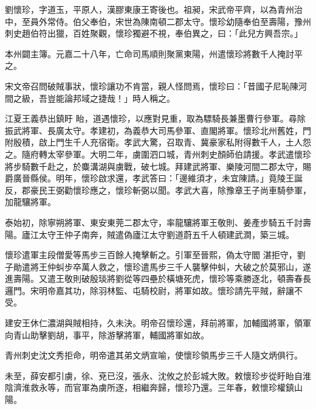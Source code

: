 
\begin{pinyinscope}

 劉懷珍，字道玉，平原人，漢膠東康王寄後也。祖昶，宋武帝平齊，以為青州治中，至員外常侍。伯父奉伯，宋世為陳南頓二郡太守。懷珍幼隨奉伯至壽陽，豫州刺史趙伯符出獵，百姓聚觀，懷珍獨避不視，奉伯異之，曰：「此兒方興吾宗。」



 本州闢主簿。元嘉二十八年，亡命司馬順則聚黨東陽，州遣懷珍將數千人掩討平之。



 宋文帝召問破賊事狀，懷珍讓功不肯當，親人怪問焉，懷珍曰：「昔國子尼恥陳河間之級，吾豈能論邦域之捷哉！」時人稱之。



 江夏王義恭出鎮盱
 眙，道遇懷珍，以應對見重，取為驃騎長兼墨曹行參軍。尋除振武將軍、長廣太守。孝建初，為義恭大司馬參軍、直閣將軍。懷珍北州舊姓，門附殷積，啟上門生千人充宿衛。孝武大驚，召取青、冀豪家私附得數千人，土人怨之。隨府轉太宰參軍。大明二年，虜圍泗口城，青州刺史顏師伯請援。孝武遣懷珍將步騎數千赴之，於麋溝湖與虜戰，破七城。拜建武將軍、樂陵河間二郡太守，賜爵廣晉縣侯。明年，懷珍啟求還，孝武答曰：「邊維須才，未宜陳請。」竟陵王誕反，郡豪民王弼勸懷珍應之，懷珍斬弼以聞。孝武大喜，除豫章王子尚車騎參軍，加龍驤將軍。



 泰始初，除寧朔將軍、東安東莞二郡太守，率龍驤將軍王敬則、姜產步騎五千討壽陽。廬江太守王仲子南奔，賊遣偽廬江太守劉道蔚五千人頓建武澗，築三城。



 懷珍遣軍主段僧愛等馬步三百餘人掩擊斬之。引軍至晉熙，偽太守閻
 湛拒守，劉子勛遣將王仲虯步卒萬人救之，懷珍遣馬步三千人襲擊仲虯，大破之於莫邪山，遂進壽陽。又遣王敬則破殷琰將劉從等四壘於橫塘死虎，懷珍等乘勝逐北，頓壽春長邏門。宋明帝嘉其功，除羽林監、屯騎校尉，將軍如故。懷珍請先平賊，辭讓不受。



 建安王休仁濃湖與賊相持，久未決。明帝召懷珍還，拜前將軍，加輔國將軍，領軍向青山助擊劉胡，事平，除游擊將軍，輔國將軍如故。



 青州刺史沈文秀拒命，明帝遣其弟文炳宣喻，使懷珍領馬步三千人隨文炳俱行。



 未至，薛安都引虜，徐、兗已沒，張永、沈攸之於彭城大敗。敕懷珍步從盱眙自淮陰濟淮救永等，而官軍為虜所逐，相繼奔歸，懷珍乃還。三年春，敕懷珍權鎮山陽。




\end{pinyinscope}
